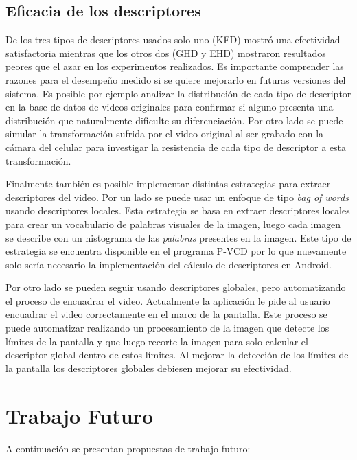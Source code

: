 \subsection*{Eficacia de los descriptores}
De los tres tipos de descriptores usados solo uno (KFD) mostró una efectividad satisfactoria mientras que los otros dos (GHD y EHD) mostraron resultados peores que el azar en los experimentos realizados. Es importante comprender las razones para el desempeño medido si se quiere mejorarlo en futuras versiones del sistema. Es posible por ejemplo analizar la distribución de cada tipo de descriptor en la base de datos de videos originales para confirmar si alguno presenta una distribución que naturalmente dificulte su diferenciación. Por otro lado se puede simular la transformación sufrida por el video original al ser grabado con la cámara del celular para investigar la resistencia de cada tipo de descriptor a esta transformación.

Finalmente también es posible implementar distintas estrategias para extraer descriptores del video. Por un lado se puede usar un enfoque de tipo \emph{bag of words} usando descriptores locales. Esta estrategia se basa en extraer descriptores locales para crear un vocabulario de palabras visuales de la imagen, luego cada imagen se describe con un histograma de las \emph{palabras} presentes en la imagen. Este tipo de estrategia se encuentra disponible en el programa P-VCD por lo que nuevamente solo sería necesario la implementación del cálculo de descriptores en Android.

Por otro lado se pueden seguir usando descriptores globales, pero automatizando el proceso de encuadrar el video. Actualmente la aplicación le pide al usuario encuadrar el video correctamente en el marco de la pantalla. Este proceso se puede automatizar realizando un procesamiento de la imagen que detecte los límites de la pantalla y que luego recorte la imagen para solo calcular el descriptor global dentro de estos límites. Al mejorar la detección de los límites de la pantalla los descriptores globales debiesen mejorar su efectividad.

\section{Trabajo Futuro}\label{futuro}

A continuación se presentan propuestas de trabajo futuro:

